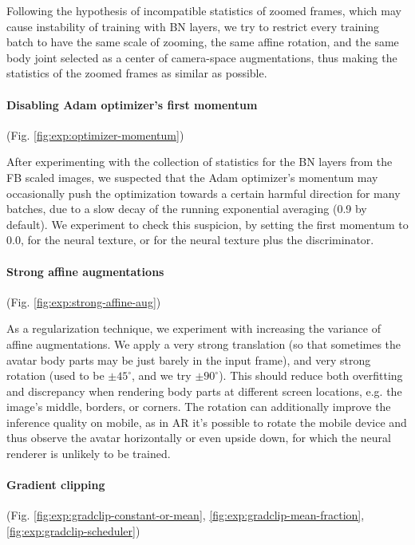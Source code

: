 Following the hypothesis of incompatible statistics of zoomed frames, which may cause instability of training with BN layers, we try to restrict every training batch to have the same scale of zooming, the same affine rotation, and the same body joint selected as a center of camera-space augmentations, thus making the statistics of the zoomed frames as similar as possible.

\vspace{-15pt}\paragraph{Disabling Adam optimizer's first momentum}(Fig. \ref{fig:exp:optimizer-momentum})\mbox{}\nopagebreak

After experimenting with the collection of statistics for the BN layers from the FB scaled images, we suspected that the Adam optimizer's momentum may occasionally push the optimization towards a certain harmful direction for many batches, due to a slow decay of the running exponential averaging (0.9 by default). We experiment to check this suspicion, by setting the first momentum to 0.0, for the neural texture, or for the neural texture plus the discriminator.

\vspace{-15pt}\paragraph{Strong affine augmentations}(Fig. \ref{fig:exp:strong-affine-aug})\mbox{}\nopagebreak

As a regularization technique, we experiment with increasing the variance of affine augmentations. We apply a very strong translation (so that sometimes the avatar body parts may be just barely in the input frame), and very strong rotation (used to be $\pm 45^\circ$, and we try $\pm 90^\circ$). This should reduce both overfitting and discrepancy when rendering body parts at different screen locations, e.g. the image's middle, borders, or corners. The rotation can additionally improve the inference quality on mobile, as in AR it's possible to rotate the mobile device and thus observe the avatar horizontally or even upside down, for which the neural renderer is unlikely to be trained.

\vspace{-15pt}\paragraph{Gradient clipping}(Fig. \ref{fig:exp:gradclip-constant-or-mean}, \ref{fig:exp:gradclip-mean-fraction}, \ref{fig:exp:gradclip-scheduler})\mbox{}\nopagebreak

